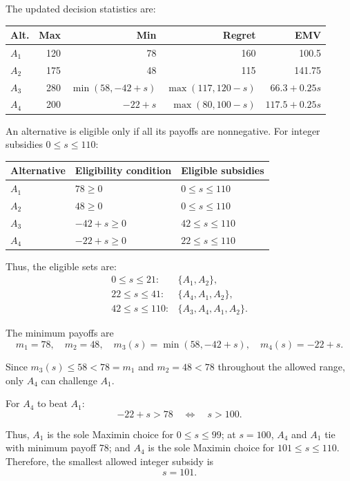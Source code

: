 The updated decision statistics are:

\begin{center}\small\setlength{\tabcolsep}{4pt}
	\begin{tabular}{lrrrr}\toprule
		Alt. & Max & Min & Regret & EMV\\ \midrule
				$A_1$ & 120 & 78 & 160 & 100.5\\
		$A_2$ & 175 & 48 & 115 & 141.75\\
		$A_3$ & 280 & $\min(58,-42+s)$ & $\max(117,120-s)$ & $66.3+0.25s$\\
		$A_4$ & 200 & $-22+s$ & $\max(80,100-s)$ & $117.5+0.25s$\\
		\bottomrule
	\end{tabular}
\end{center}

An alternative is eligible only if all its payoffs are nonnegative.
For integer subsidies $0\le s\le110$:

\begin{center}
\begin{tabular}{lll}\toprule
Alternative & Eligibility condition & Eligible subsidies\\\midrule
$A_1$ & $78\ge0$ & $0\le s\le110$\\
$A_2$ & $48\ge0$ & $0\le s\le110$\\
$A_3$ & $-42+s\ge0$ & $42\le s\le110$\\
$A_4$ & $-22+s\ge0$ & $22\le s\le110$\\
\bottomrule
\end{tabular}
\end{center}

Thus, the eligible sets are:
\[
\begin{array}{ll}
0\le s\le21: & \{A_1,A_2\},\\
22\le s\le41: & \{A_4,A_1,A_2\},\\
42\le s\le110: & \{A_3,A_4,A_1,A_2\}.
\end{array}
\]

The minimum payoffs are
\[
m_1=78,\quad m_2=48,\quad
m_3(s)=\min(58,-42+s),\quad m_4(s)=-22+s.
\]

Since $m_3(s)\le58<78=m_1$ and $m_2=48<78$ throughout
the allowed range, only $A_4$ can challenge $A_1$.

For $A_4$ to beat $A_1$:
\[
-22+s>78
\quad\Longleftrightarrow\quad s>100.
\]

Thus, $A_1$ is the sole Maximin choice for $0\le s\le99$;
at $s=100$, $A_4$ and $A_1$ tie with minimum payoff 78;
and $A_4$ is the sole Maximin choice for $101\le s\le110$.
Therefore, the smallest allowed integer subsidy is
\[
\boxed{s=101}.
\]

